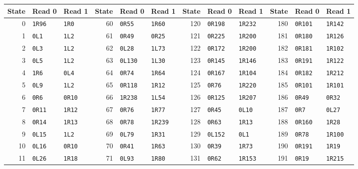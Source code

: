 \begingroup
\centering
\fontsize{8}{9.1}\selectfont
\setlength{\tabcolsep}{3.4pt}
\begin{tabular}{rll@{\hspace{12pt}}rll@{\hspace{12pt}}rll@{\hspace{12pt}}rll}
\toprule
State & Read 0 & Read 1 & State & Read 0 & Read 1 & State & Read 0 & Read 1 & State & Read 0 & Read 1\\
\midrule
0 & \texttt{1R96} & \texttt{1R0} & 60 & \texttt{0R55} & \texttt{1R60} & 120 & \texttt{0R198} & \texttt{1R232} & 180 & \texttt{0R101} & \texttt{1R142}\\
1 & \texttt{0L1} & \texttt{1L2} & 61 & \texttt{0R49} & \texttt{0R25} & 121 & \texttt{0R225} & \texttt{1R200} & 181 & \texttt{0R180} & \texttt{1R126}\\
2 & \texttt{0L3} & \texttt{1L2} & 62 & \texttt{0L28} & \texttt{1L73} & 122 & \texttt{0R172} & \texttt{1R200} & 182 & \texttt{0R181} & \texttt{1R102}\\
3 & \texttt{0L5} & \texttt{1L2} & 63 & \texttt{0L130} & \texttt{1L30} & 123 & \texttt{0R145} & \texttt{1R146} & 183 & \texttt{0R191} & \texttt{1R122}\\
4 & \texttt{1R6} & \texttt{0L4} & 64 & \texttt{0R74} & \texttt{1R64} & 124 & \texttt{0R167} & \texttt{1R104} & 184 & \texttt{0R182} & \texttt{1R212}\\
5 & \texttt{0L9} & \texttt{1L2} & 65 & \texttt{0R118} & \texttt{1R12} & 125 & \texttt{0R76} & \texttt{1R220} & 185 & \texttt{0R101} & \texttt{1R101}\\
6 & \texttt{0R6} & \texttt{0R10} & 66 & \texttt{1R238} & \texttt{1L54} & 126 & \texttt{0R125} & \texttt{1R207} & 186 & \texttt{0R49} & \texttt{0R32}\\
7 & \texttt{0R11} & \texttt{1R12} & 67 & \texttt{0R76} & \texttt{1R77} & 127 & \texttt{0R45} & \texttt{0L10} & 187 & \texttt{0R7} & \texttt{0L27}\\
8 & \texttt{0R14} & \texttt{1R13} & 68 & \texttt{0R78} & \texttt{1R239} & 128 & \texttt{0R63} & \texttt{1R13} & 188 & \texttt{0R160} & \texttt{1R28}\\
9 & \texttt{0L15} & \texttt{1L2} & 69 & \texttt{0L79} & \texttt{1R31} & 129 & \texttt{0L152} & \texttt{0L1} & 189 & \texttt{0R78} & \texttt{1R100}\\
10 & \texttt{0L16} & \texttt{0R10} & 70 & \texttt{0R41} & \texttt{1R63} & 130 & \texttt{0R39} & \texttt{1R73} & 190 & \texttt{0R191} & \texttt{1R19}\\
11 & \texttt{0L26} & \texttt{1R18} & 71 & \texttt{0L93} & \texttt{1R80} & 131 & \texttt{0R62} & \texttt{1R153} & 191 & \texttt{0R19} & \texttt{1R215}\\

\end{tabular}
